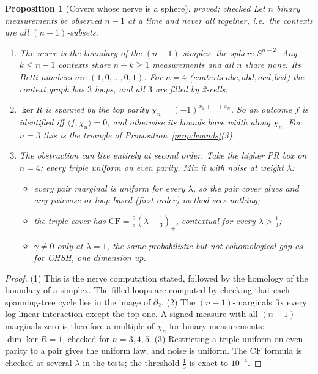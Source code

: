 \documentclass[11pt]{article}
\newtheorem{proposition}[theorem]{Proposition}
\theoremstyle{definition}
\theoremstyle{remark}
\newcommand{\CF}{\mathrm{CF}}
\newcommand{\st}[1]{\textsf{\small\color{gray}#1}}
\begin{document}
\begin{proposition}[Covers whose nerve is a sphere]\label{prop:higher}\st{proved; checked}
Let $n$ binary measurements be observed $n-1$ at a time and never all together, i.e.\ the contexts are all $(n-1)$-subsets.
\begin{enumerate}
  \item The nerve is the boundary of the $(n-1)$-simplex, the sphere $S^{n-2}$. Any $k\le n-1$ contexts share $n-k\ge1$ measurements and all $n$ share none. Its Betti numbers are $(1,0,\dots,0,1)$. For $n=4$ (contexts $abc,abd,acd,bcd$) the context graph has $3$ loops, and all $3$ are filled by 2-cells.
  \item $\ker R$ is spanned by the top parity $\chi_n=(-1)^{x_1+\dots+x_n}$. So an outcome $f$ is identified iff $\langle f,\chi_n\rangle=0$, and otherwise its bounds have width along $\chi_n$. For $n=3$ this is the triangle of Proposition~\ref{prop:bounds}(3).
  \item \emph{The obstruction can live entirely at second order.} Take the \emph{higher PR box} on $n=4$: every triple uniform on even parity. Mix it with noise at weight $\lambda$:
  \begin{itemize}
    \item every pair marginal is uniform for every $\lambda$, so the pair cover glues and any pairwise or loop-based (first-order) method sees nothing;
    \item the triple cover has $\CF=\tfrac98(\lambda-\tfrac13)_+$, contextual for every $\lambda>\tfrac13$;
    \item $\gamma\ne0$ only at $\lambda=1$, the same probabilistic-but-not-cohomological gap as for CHSH, one dimension up.
  \end{itemize}
\end{enumerate}
\end{proposition}
\begin{proof}
(1) This is the nerve computation stated, followed by the homology of the boundary of a simplex. The filled loops are computed by checking that each spanning-tree cycle lies in the image of $\partial_2$. (2) The $(n-1)$-marginals fix every log-linear interaction except the top one. A signed measure with all $(n-1)$-marginals zero is therefore a multiple of $\chi_n$ for binary measurements: $\dim\ker R=1$, checked for $n=3,4,5$. (3) Restricting a triple uniform on even parity to a pair gives the uniform law, and noise is uniform. The $\CF$ formula is checked at several $\lambda$ in the tests; the threshold $\tfrac13$ is exact to $10^{-4}$.
\end{proof}
\end{document}
